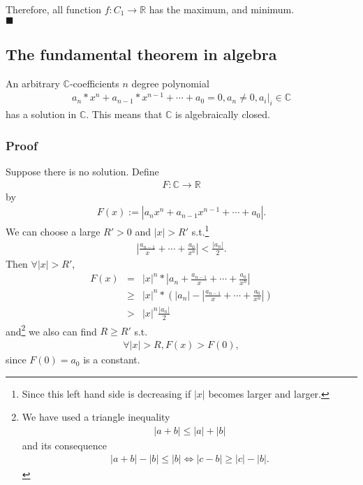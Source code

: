 \documentclass[11pt]{book}
\begin{document}
Therefore, all function $f : C_1 \to \mathbb{R}$ has the maximum, and minimum.\\
$\blacksquare$

\subsection{The fundamental theorem in algebra}
An arbitrary $\mathbb{C}$-coefficients $n$ degree polynomial
\begin{eqnarray}
\label{nDegreePolynomial}
a_n * x^n + a_{n-1} * x^{n-1} + \cdots + a_0 = 0, a_n \neq 0, \left. a_i\right|_i \in \mathbb{C}
\end{eqnarray}
has a solution in $\mathbb{C}$.
This means that $\mathbb{C}$ is algebraically closed.

\subsubsection{Proof}
Suppose there is no solution.
Define
\begin{eqnarray}
F: \mathbb{C} \to \mathbb{R}
\end{eqnarray}
by
\begin{eqnarray}
F(x) := \left| a_n x^n + a_{n-1} x^{n-1} + \cdots + a_0 \right|.
\end{eqnarray}
We can choose a large $R'>0$ and $|x|>R'$ s.t.\footnote{
Since this left hand side is decreasing if $|x|$ becomes larger and larger.
}
\begin{eqnarray}
\left|\frac{a_{n-1}}{x} + \cdots + \frac{a_0}{x^n} \right| < \frac{|a_n|}{2}.
\end{eqnarray}
Then $\forall |x| > R'$,
\begin{eqnarray}
F(x) &=& |x|^n * \left|a_n + \frac{a_{n-1}}{x} + \cdots + \frac{a_0}{x^n} \right| \\
&\geq& |x|^n *\left( \left|a_n \right| - \left| \frac{a_{n-1}}{x} + \cdots + \frac{a_0}{x^n} \right| \right) \\
&>& |x|^n \frac{|a_n|}{2} 
\end{eqnarray}
and\footnote{
We have used a triangle inequality
\begin{eqnarray}
|a+b| \leq |a| + |b|
\end{eqnarray}
and its consequence
\begin{eqnarray}
|a+b| - |b| \leq |b| \Leftrightarrow |c-b| \geq |c| -|b|.
\end{eqnarray}
}
we also can find $R \geq R'$ s.t.
\begin{eqnarray}
\forall |x| > R, F(x) > F(0),
\end{eqnarray}
since $F(0) = a_0$ is a constant.
\end{document}
